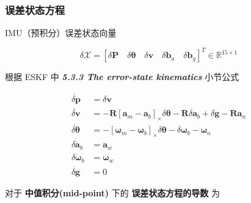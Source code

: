 \documentclass[12pt,a4paper]{article}
\begin{document}
\subsubsection{误差状态方程}

IMU（预积分）误差状态向量  

\begin{equation}
\delta \mathcal{X} =
[
\delta \mathbf{P} \quad 
\delta \boldsymbol{\theta} \quad 
\delta \mathbf{v} \quad 
\delta \mathbf{b}_a \quad 
\delta \mathbf{b}_g]^T
\in \mathbb{R}^{15 \times 1}
\end{equation}

根据 \cite{DBLP:journals/corr/abs-1711-02508} ESKF 中 \textit{\textbf{5.3.3 The error-state kinematics}} 小节公式  

\begin{equation}
\begin{aligned}
\dot{\delta \mathbf{p}} &= \delta \mathbf{v} \\
\dot{\delta \mathbf{v}} &= -\mathbf{R}\left[\mathbf{a}_{m}-\mathbf{a}_{b}\right]_{ \times} \delta \boldsymbol{\theta}-\mathbf{R} \delta \mathbf{a}_{b}+\delta \mathbf{g}-\mathbf{R} \mathbf{a}_{n} \\
\dot{\delta \boldsymbol{\theta}} &= -\left[\boldsymbol{\omega}_{m}-\boldsymbol{\omega}_{b}\right]_{ \times} \delta \boldsymbol{\theta}-\delta \boldsymbol{\omega}_{b}-\boldsymbol{\omega}_{n} \\
\delta \dot{\mathbf{a}}_{b} &= \mathbf{a}_{w} \\ 
\delta \dot{\boldsymbol{\omega}}_{b} &= \boldsymbol{\omega}_{w} \\ 
\dot{\delta \mathbf{g}} &= 0 
\end{aligned}
\end{equation}

对于 \textbf{中值积分(mid-point)} 下的 \textbf{误差状态方程的导数} 为  
\end{document}
